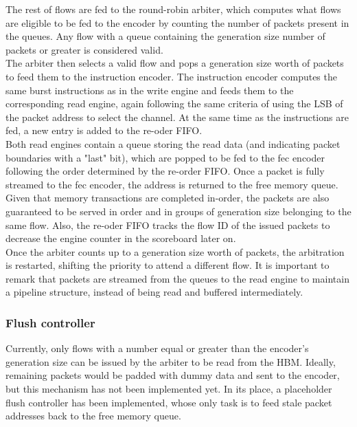 The rest of flows are fed to the round-robin arbiter, which computes what flows are eligible to be fed to the encoder by counting the number of packets 
present in the queues. Any flow with a queue containing the generation size number of packets or greater is considered valid.\\

The arbiter then selects a valid flow and pops a generation size worth of packets to feed them to the instruction encoder. The instruction encoder 
computes the same burst instructions as in the write engine and feeds them to the corresponding read engine, again following the same criteria of using the 
LSB of the packet address to select the channel. At the same time as the instructions are fed, a new entry is added to the re-oder FIFO. \\

Both read engines contain a queue storing the read data (and indicating packet boundaries with a "last" bit), which are popped to be fed to the \gls{fec} encoder 
following the order determined by the re-order FIFO. Once a packet is fully streamed to the \gls{fec} encoder, the address is returned to the free memory queue.
Given that memory transactions are completed in-order, the packets are also guaranteed to be served in order and in groups of generation size belonging to the same flow. 
Also, the re-oder FIFO tracks the flow ID of the issued packets to decrease the engine counter in the scoreboard later on. \\

Once the arbiter counts up to a generation size worth of packets, the arbitration is restarted, shifting the priority to attend a different flow. It is important 
to remark that packets are streamed from the queues to the read engine to maintain a pipeline structure, instead of being read and buffered intermediately. \\


\subsubsection{Flush controller}
Currently, only flows with a number equal or greater than the encoder's generation size can be issued by the 
arbiter to be read from the HBM. Ideally, remaining packets would be padded with dummy data and sent to 
the encoder, but this mechanism has not been implemented yet. In its place, a placeholder flush controller has been implemented, 
whose only task is to feed stale packet addresses back to the free memory queue. \\

